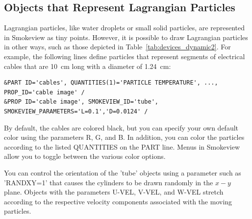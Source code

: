 \subsection{Objects that Represent Lagrangian Particles}
\label{info:SMOKEVIEW_PART}

Lagrangian particles, like water droplets or small solid particles, are represented in Smokeview as tiny points. However, it is possible to draw Lagrangian particles in other ways, such as those depicted in Table~\ref{tab:devices_dynamic2}. For example, the following lines define particles that represent segments of electrical cables that are 10~cm long with a diameter of 1.24~cm:
\begin{lstlisting}
&PART ID='cables', QUANTITIES(1)='PARTICLE TEMPERATURE', ..., PROP_ID='cable image' /
&PROP ID='cable image', SMOKEVIEW_ID='tube', SMOKEVIEW_PARAMETERS='L=0.1','D=0.0124' /
\end{lstlisting}
By default, the cables are colored black, but you can specify your own default color using the parameters {\ct R}, {\ct G}, and {\ct B}. In addition, you can color the particles according to the listed {\ct QUANTITIES} on the {\ct PART} line. Menus in Smokeview allow you to toggle between the various color options.

You can control the orientation of the {\ct 'tube'} objects using a parameter such as {\ct 'RANDXY=1'} that causes the cylinders to be drawn randomly in the $x-y$ plane. Objects with the parameters {\ct U-VEL}, {\ct V-VEL}, and {\ct W-VEL} stretch according to the respective velocity components associated with the moving particles.

